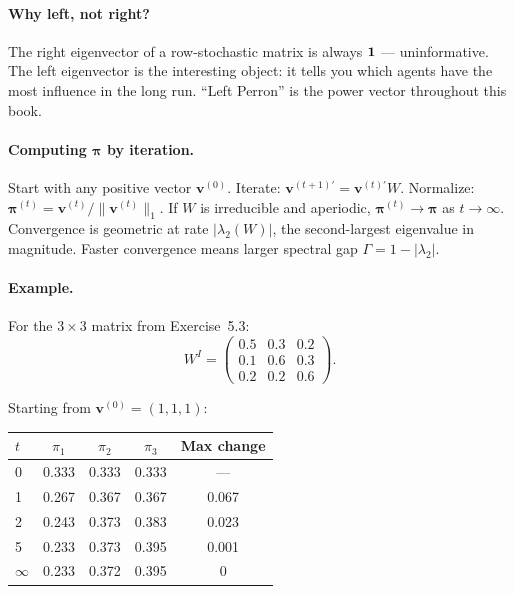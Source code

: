 \documentclass[../structural_economics_book.tex]{subfiles}
\begin{document}
\paragraph{Why left, not right?} The right eigenvector of a row-stochastic matrix is always $\mathbf{1}$ --- uninformative. The left eigenvector is the interesting object: it tells you which agents have the most influence in the long run. ``Left Perron'' is the power vector throughout this book.

\paragraph{Computing $\boldsymbol{\pi}$ by iteration.} Start with any positive vector $\mathbf{v}^{(0)}$. Iterate: $\mathbf{v}^{(t+1)\prime} = \mathbf{v}^{(t)\prime} W$. Normalize: $\boldsymbol{\pi}^{(t)} = \mathbf{v}^{(t)} / \|\mathbf{v}^{(t)}\|_1$. If $W$ is irreducible and aperiodic, $\boldsymbol{\pi}^{(t)} \to \boldsymbol{\pi}$ as $t \to \infty$. Convergence is geometric at rate $|\lambda_2(W)|$, the second-largest eigenvalue in magnitude. Faster convergence means larger spectral gap $\Gamma = 1 - |\lambda_2|$.

\paragraph{Example.} For the $3 \times 3$ matrix from Exercise~5.3:
\begin{equation}
W^I = \begin{pmatrix} 0.5 & 0.3 & 0.2 \\ 0.1 & 0.6 & 0.3 \\ 0.2 & 0.2 & 0.6 \end{pmatrix}.
\end{equation}

Starting from $\mathbf{v}^{(0)} = (1, 1, 1)$:
\begin{center}
\begin{tabular}{lcccc}
\toprule
$t$ & $\pi_1$ & $\pi_2$ & $\pi_3$ & Max change \\
\midrule
0 & 0.333 & 0.333 & 0.333 & --- \\
1 & 0.267 & 0.367 & 0.367 & 0.067 \\
2 & 0.243 & 0.373 & 0.383 & 0.023 \\
5 & 0.233 & 0.373 & 0.395 & 0.001 \\
$\infty$ & 0.233 & 0.372 & 0.395 & 0 \\
\bottomrule
\end{tabular}
\end{center}
\end{document}
